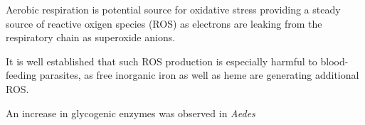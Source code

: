 Aerobic respiration is potential source for oxidative stress providing
a steady source of reactive oxigen species (ROS) as electrons are
leaking from the respiratory chain as superoxide anions.

It is well established that such ROS production is especially harmful
to blood-feeding parasites, as free inorganic iron as well as heme are
generating additional ROS.

An increase in glycogenic enzymes was observed in \textit{Aedes}


